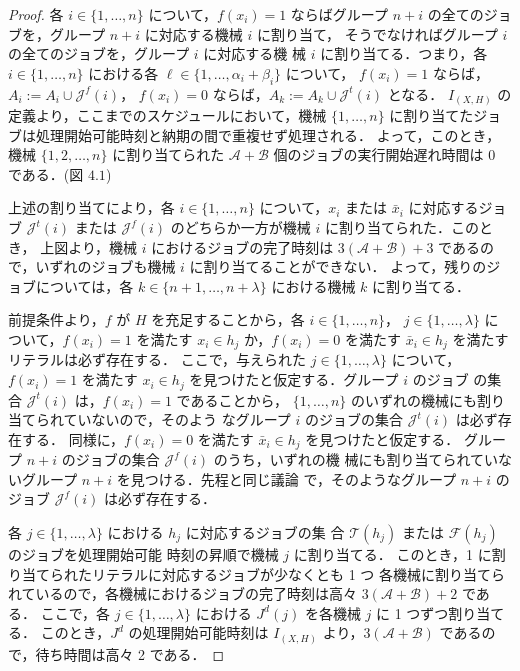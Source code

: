 \documentclass[12pt]{optlab-bachelor}
\begin{document}
\begin{proof}
  各 $i \in \{1,\ldots, n\}$ について，$f(x_i) = 1$ ならばグループ $n +
  i$ の全てのジョブを，グループ $n + i$ に対応する機械 $i$ に割り当て，
  そうでなければグループ $i$ の全てのジョブを，グループ $i$ に対応する機
  械 $i$ に割り当てる．つまり，各 $i \in \{1,\ldots, n\}$ における各
  $\ell \in \{1,\ldots,\alpha_i + \beta_i\}$ について，
  $f(x_i) = 1$ ならば，$A_i := A_i \cup \mathcal{J}^f(i)$，
  $f(x_i) = 0$ ならば，$A_k := A_k \cup \mathcal{J}^t(i)$ となる．
  $I_{(X,H)}$ の定義より，ここまでのスケジュールにおいて，機械
  $\{1,\ldots, n\}$ に割り当てたジョブは処理開始可能時刻と納期の間で重複せず処理される．
  よって，このとき，機械 $\{1,2,\ldots,n\}$ に割り当てられた
  $\mathcal{A} + \mathcal{B}$ 個のジョブの実行開始遅れ時間は $0$ である．(図 $4.1$)

  上述の割り当てにより，各 $i \in \{1,\ldots,n\}$ について，$x_i$ または
  $\bar x_i$ に対応するジョブ $\mathcal{J}^t(i)$ または
  $\mathcal{J}^f(i)$ のどちらか一方が機械 $i$ に割り当てられた．このとき，
  上図より，機械 $i$ におけるジョブの完了時刻は $3(\mathcal{A} +
  \mathcal{B}) + 3$ であるので，いずれのジョブも機械 $i$ に割り当てることができない．
  よって，残りのジョブについては，各 $k \in \{n + 1,\ldots,n +
  \lambda\}$ における機械 $k$ に割り当てる．

  前提条件より，$f$ が $H$ を充足することから，各 $i \in \{1,\ldots,n\}$，
  $j \in \{1, \ldots, \lambda \}$ について，$f(x_i) = 1$ を満たす $x_i
  \in h_j$ か，$f(x_i) = 0$ を満たす $\bar x_i \in h_j$ を満たすリテラルは必ず存在する．
  ここで，与えられた $j \in \{1, \ldots, \lambda \}$ について，$f(x_i) =
  1$ を満たす $x_i \in h_j$ を見つけたと仮定する．グループ $i$ のジョブ
  の集合 $\mathcal{J}^t(i)$ は，$f(x_i) = 1$ であることから，
  $\{1,\ldots,n\}$ のいずれの機械にも割り当てられていないので，そのよう
  なグループ $i$ のジョブの集合 $\mathcal{J}^t(i)$ は必ず存在する．
  同様に，$f(x_i) = 0$ を満たす $\bar x_i \in h_j$ を見つけたと仮定する．
  グループ $n + i$ のジョブの集合 $\mathcal{J}^f(i)$ のうち，いずれの機
  械にも割り当てられていないグループ $n + i$ を見つける．先程と同じ議論
  で，そのようなグループ $n + i$ のジョブ $\mathcal{J}^f(i)$ は必ず存在する．

  各 $j \in \{1, \ldots, \lambda \}$ における $h_j$ に対応するジョブの集
  合 $\mathcal{T}(h_j)$ または $\mathcal{F}(h_j)$ のジョブを処理開始可能
  時刻の昇順で機械 $j$ に割り当てる．
  このとき，1 に割り当てられたリテラルに対応するジョブが少なくとも 1 つ
  各機械に割り当てられているので，各機械におけるジョブの完了時刻は高々
  $3(\mathcal{A} + \mathcal{B}) + 2$ である．
  ここで，各 $j \in \{1,\ldots,\lambda\}$ における $J^d(j)$ を各機械 $j$
  に 1 つずつ割り当てる．
  このとき，$J^d$ の処理開始可能時刻は $I_{(X,H)}$ より，$3(\mathcal{A}
  + \mathcal{B})$ であるので，待ち時間は高々 2 である．


\end{proof}
\end{document}
